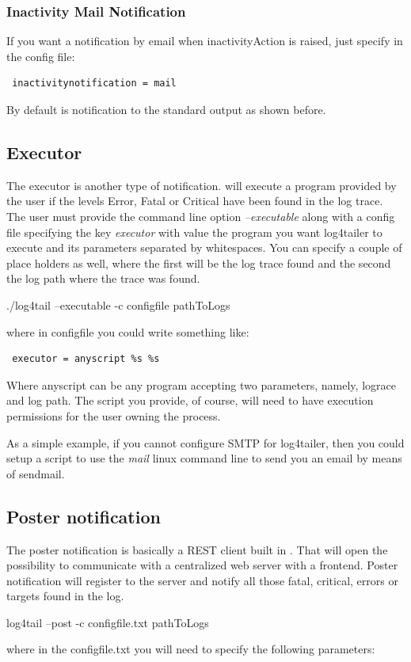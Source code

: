 \subsubsection{Inactivity Mail Notification}
If you want a notification by email when inactivityAction is raised, just specify in the 
config file:

\begin{config}
\begin{verbatim}
 inactivitynotification = mail
\end{verbatim}
\end{config}

\noindent
By default is notification to the standard output as shown before. 

\subsection{Executor}
\label{sec:executor}

The executor is another type of notification. \logftailer{} will execute a
program provided by the user if the levels Error, Fatal or Critical have been
found in the log trace. The user must provide the command line option
\emph{--executable} along with a config file specifying the key \emph{executor}
with value the program you want log4tailer to execute and its parameters
separated by whitespaces. You can specify a couple of place holders as well,
where the first will be the log trace found and the second the log path where
the trace was found.

\begin{cmd}
 ./log4tail --executable -c configfile pathToLogs
\end{cmd}

where in configfile you could write something like:

\begin{verbatim}
 executor = anyscript %s %s 
\end{verbatim}

Where anyscript can be any program accepting two parameters, namely, lograce and log path. The script 
you provide, of course, will need to have execution permissions for the user 
owning the \logftailer{} process. 

As a simple example, if you cannot configure SMTP for log4tailer, then you could 
setup a script to use the \emph{mail} linux command line to send you an email by means of sendmail.

\subsection{Poster notification}
\label{sec:poster}
The poster notification is basically a REST client built in \logftailer{}. That will open 
the possibility to communicate with a centralized web server with a frontend. Poster 
notification will register to the server and notify all those fatal, critical, errors or 
targets found in the log. 
\begin{cmd}
 log4tail --post -c configfile.txt pathToLogs
\end{cmd}
where in the configfile.txt you will need to specify the following parameters:

